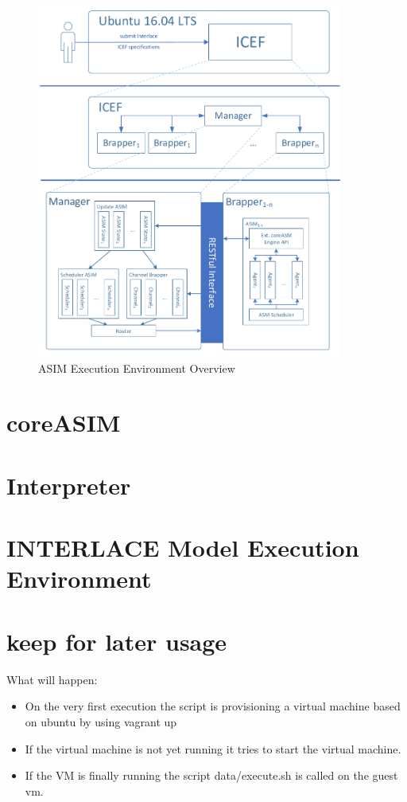\begin{figure}[htbp]
  \centering
  \includegraphics[width=0.9\textwidth, clip, trim=1mm 1mm 1mm 1mm]{Figures/environment_asim}
  \caption{ASIM Execution Environment Overview}
  \label{fig:icef-intro-asim}
\end{figure}


\section{coreASIM}

\section{Interpreter}

\section{INTERLACE Model Execution Environment}
\label{sec:env-exec}

\section{keep for later usage}
What will happen:
\begin{itemize}
	\item On the very first execution the script is provisioning a virtual machine based on ubuntu by using vagrant up
	\item If the virtual machine is not yet running it tries to start the virtual machine.
	\item If the VM is finally running the script data/execute.sh is called on the guest vm.
\end{itemize}

